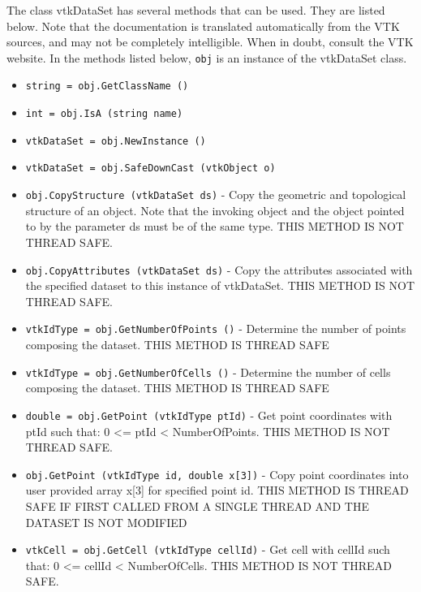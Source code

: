 The class vtkDataSet has several methods that can be used.
  They are listed below.
Note that the documentation is translated automatically from the VTK sources,
and may not be completely intelligible.  When in doubt, consult the VTK website.
In the methods listed below, \verb|obj| is an instance of the vtkDataSet class.
\begin{itemize}
\item  \verb|string = obj.GetClassName ()|

\item  \verb|int = obj.IsA (string name)|

\item  \verb|vtkDataSet = obj.NewInstance ()|

\item  \verb|vtkDataSet = obj.SafeDownCast (vtkObject o)|

\item  \verb|obj.CopyStructure (vtkDataSet ds)| -  Copy the geometric and topological structure of an object. Note that
 the invoking object and the object pointed to by the parameter ds must
 be of the same type.
 THIS METHOD IS NOT THREAD SAFE.

\item  \verb|obj.CopyAttributes (vtkDataSet ds)| -  Copy the attributes associated with the specified dataset to this
 instance of vtkDataSet.
 THIS METHOD IS NOT THREAD SAFE.

\item  \verb|vtkIdType = obj.GetNumberOfPoints ()| -  Determine the number of points composing the dataset.
 THIS METHOD IS THREAD SAFE

\item  \verb|vtkIdType = obj.GetNumberOfCells ()| -  Determine the number of cells composing the dataset.
 THIS METHOD IS THREAD SAFE

\item  \verb|double = obj.GetPoint (vtkIdType ptId)| -  Get point coordinates with ptId such that: 0 <= ptId < NumberOfPoints.
 THIS METHOD IS NOT THREAD SAFE.

\item  \verb|obj.GetPoint (vtkIdType id, double x[3])| -  Copy point coordinates into user provided array x[3] for specified
 point id.
 THIS METHOD IS THREAD SAFE IF FIRST CALLED FROM A SINGLE THREAD AND
 THE DATASET IS NOT MODIFIED

\item  \verb|vtkCell = obj.GetCell (vtkIdType cellId)| -  Get cell with cellId such that: 0 <= cellId < NumberOfCells.
 THIS METHOD IS NOT THREAD SAFE.


\end{itemize}

